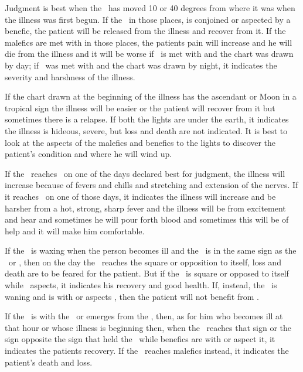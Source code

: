 Judgment is best when the \Moon\, has moved 10 or 40 degrees from where it was when the illness was first begun.  If the \Moon\, in those places, is conjoined or aspected by a benefic, the patient will be released from the illness and recover from it. If the malefics are met with in those places, the patients pain will increase and he will die from the illness and it will be worse if \Mars\, is met with and the chart was drawn by day; if \Saturn\, was met with and the chart was drawn by night, it indicates the severity and harshness of the illness.

If the chart drawn at the beginning of the illness has the ascendant or Moon in a tropical sign the illness will be easier or the patient will recover from it but sometimes there is a relapse. If both the lights are under the earth, it indicates the illness is hideous, severe, but loss and death are not indicated. It is best to look at the aspects of the malefics and benefics to the lights to discover the patient's condition and where he will wind up.

If the \Moon\, reaches \Saturn\, on one of the days declared best for judgment, the illness will increase because of fevers and chills and stretching and extension of the nerves. If it reaches \Mars\, on one of those days, it indicates the illness will increase and be harsher from a hot, strong, sharp fever and the illness will be from excitement and hear and sometimes he will pour forth blood and sometimes this will be of help and it will make him comfortable.

If the \Moon\, is waxing when the person becomes ill and the \Moon\, is in the same sign as the \Sun\, or \Mars, then on the day the \Moon\, reaches the square or opposition to itself, loss and death are to be feared for the patient.  But if the \Moon\, is square or opposed to itself while \Saturn\, aspects, it indicates his recovery and good health. If, instead, the \Moon\, is waning and is with or aspects \Saturn, then the patient will not benefit from \Saturn.

If the \Moon\, is with the \Sun\, or emerges from the \Sun, then, as for him who becomes ill at that hour or whose illness is beginning then, when the \Moon\, reaches that sign or the sign opposite the sign that held the \Moon\, while benefics are with or aspect it, it indicates the patients recovery. If the \Moon\, reaches malefics instead, it indicates the patient's death and loss.

